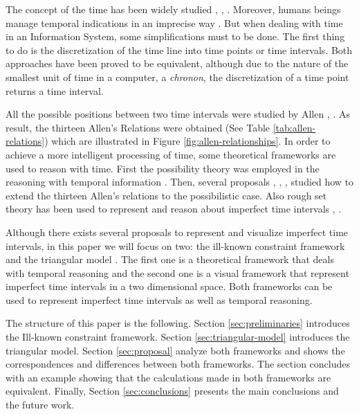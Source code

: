 
The concept of the time has been widely studied \cite{Benthem1982}, \cite{Shackle1961}, \cite{Klein1994}. Moreover, humans beings manage temporal indications in an imprecise way \cite{Devos1998}. But when dealing with time in an Information System, some simplifications must to be done. The first thing to do is the discretization of the time line into time points or time intervals. Both approaches have been proved to be equivalent, although due to the nature of the smallest unit of time in a computer, a \emph{chronon}, the discretization of a time point returns a time interval.

All the possible positions between two time intervals were studied by Allen \cite{Allen1983}, \cite{Allen1985}. As result, the thirteen Allen's Relations were obtained (See Table \ref{tab:allen-relations}) which are illustrated in Figure \ref{fig:allen-relationships}. In order to achieve a more intelligent processing of time, some theoretical frameworks are used to reason with time. First the possibility theory was employed in the reasoning with temporal information \cite{Dubois2003a}. Then, several proposals \cite{Schockaert2008}, \cite{nagypal2003}, \cite{Ohlbach2004}, \cite{Pons2011} studied how to extend the thirteen Allen's relations to the possibilistic case. Also rough set theory \cite{Pawlak1995} has been used to represent and reason about imperfect time intervals \cite{Qiang2009}, \cite{Qiang2010}.

Although there exists several proposals to represent and visualize imperfect time intervals, in this paper we will focus on two: the ill-known constraint framework \cite{Pons2011} and the triangular model \cite{DeTre2012}. The first one is a theoretical framework that deals with temporal reasoning and the second one is a visual framework that represent imperfect time intervals in a two dimensional space. Both frameworks can be used to represent imperfect time intervals as well as temporal reasoning.

The structure of this paper is the following. Section  \ref{sec:preliminaries} introduces the Ill-known constraint framework. Section \ref{sec:triangular-model} introduces the triangular model. Section \ref{sec:proposal} analyze both frameworks and shows the correspondences and differences between both frameworks. The section concludes with an example showing that the calculations made in both frameworks are equivalent. Finally, Section \ref{sec:conclusions} presents the main conclusions and the future work. 


